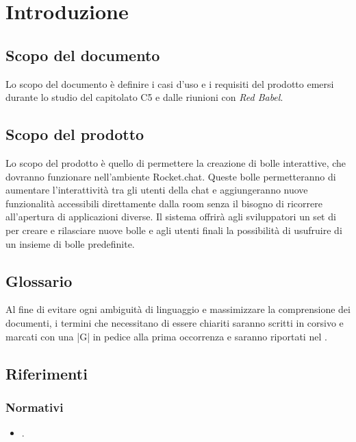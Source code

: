 \section{Introduzione}

\subsection{Scopo del documento}
Lo scopo del documento è definire i casi d'uso e i requisiti del prodotto emersi durante lo studio del capitolato C5 e dalle riunioni con \textit{Red Babel}.

\subsection{Scopo del prodotto}

Lo scopo del prodotto è quello di permettere la creazione di bolle
interattive, che dovranno funzionare nell’ambiente Rocket.chat. Queste
bolle permetteranno di aumentare l'interattività tra gli utenti della
chat e aggiungeranno nuove funzionalità accessibili
direttamente dalla room senza il bisogno di ricorrere
all'apertura di applicazioni diverse.
Il sistema offrirà agli sviluppatori un set di  per creare e
rilasciare nuove bolle e agli utenti finali la possibilità di
usufruire di un insieme di bolle predefinite.

\subsection{Glossario}

Al fine di evitare ogni ambiguità di linguaggio e massimizzare la
comprensione dei documenti, i termini che necessitano di essere
chiariti saranno scritti in corsivo e marcati con una |G| in pedice alla prima
occorrenza e saranno riportati nel \gloss.


\subsection{Riferimenti}

\subsubsection{Normativi}
\begin{itemize}
\item \textbf{\normediprogetto}.
\end{itemize}

